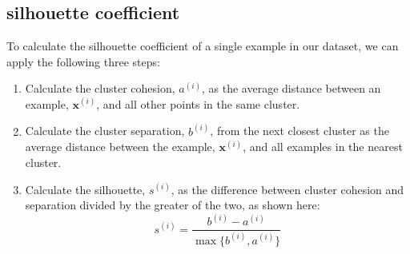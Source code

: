 \chapter{\label{}}
\section{silhouette coefficient}
To calculate the silhouette coefficient of a single example in our dataset, we can
apply the following three steps:
\begin{enumerate}
    \item Calculate the cluster cohesion, $a^{(i)}$, as the average distance between an example, $\bm{x}^{(i)}$, and all other points in the same cluster.
    \item Calculate the cluster separation, $b^(i)$, from the next closest cluster as the average distance between the example, $\bm{x}^{(i)}$, and all examples in the nearest cluster.
    \item Calculate the silhouette, $s^{(i)}$, as the difference between cluster cohesion and separation divided by the greater of the two, as shown here:
          \begin{equation}
              s^{(i)}=\frac{b^{(i)}-a^{(i)}}{\max\{b^{(i)},a^{(i)}\}}
          \end{equation}
\end{enumerate}